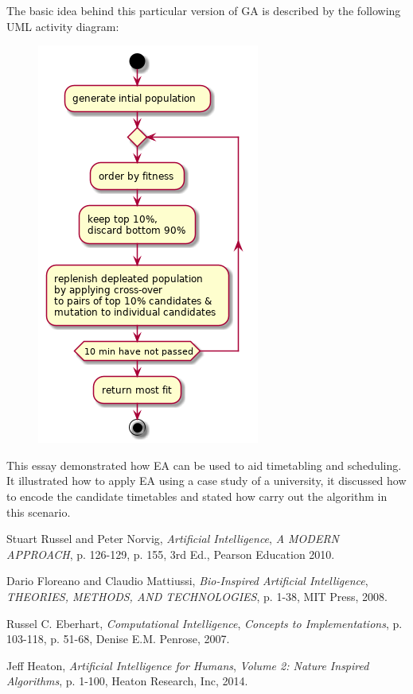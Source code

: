 \documentclass[a4paper, 12pt, titlepage]{article}
\begin{document}
The basic idea behind this particular version of GA is described by the
following UML activity diagram: 

\begin{figure}[h]
    \includegraphics[scale=0.6]{algo.png}
    \centering
\end{figure}

This essay demonstrated how EA can be used to aid timetabling and
scheduling. It illustrated how to apply EA using a case study of a
university, it discussed how to encode the candidate timetables and
stated how carry out the algorithm in this scenario.

\begin{thebibliography}{9}

  
  Stuart Russel and Peter Norvig,
  \textit{Artificial Intelligence},
  \textit{A MODERN APPROACH},
  p. 126-129, 
  p. 155,
  3rd Ed., 
  Pearson Education
  2010.

  Dario Floreano and Claudio Mattiussi,
  \textit{Bio-Inspired Artificial Intelligence},
  \textit{THEORIES, METHODS, AND TECHNOLOGIES},
  p. 1-38,
  MIT Press,
  2008.

  Russel C. Eberhart,
  \textit{Computational Intelligence},
  \textit{Concepts to Implementations},
  p. 103-118,
  p. 51-68,
  Denise E.M. Penrose,
  2007.

  Jeff Heaton,
  \textit{Artificial Intelligence for Humans},
  \textit{Volume 2: Nature Inspired Algorithms},
  p. 1-100,
  Heaton Research, Inc,
  2014.

\end{thebibliography}
\end{document}
